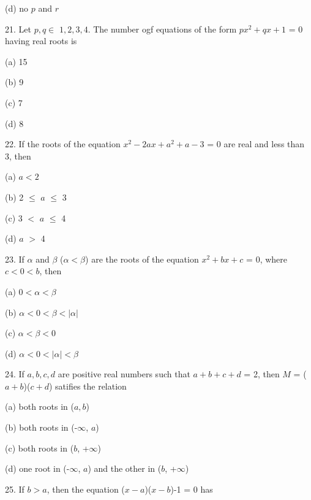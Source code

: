 \documentclass[journal,12pt,twocolumn]{IEEEtran}
\theoremstyle{remark}
\begin{document}
(d) no $p$ and $r$

21.    Let $p,q \in$  ${1, 2, 3, 4}$. The number ogf equations of the form $px^2+qx+1$ = 0 having real roots is

(a) 15

(b) 9

(c) 7

(d) 8

22.    If the roots of the equation $x^2-2ax+a^2+a-3$ = 0 are real and less than 3, then

(a) $a<2$

(b) 2 $\leq$ $a$ $\leq$ 3

(c) 3 $<$ $a$ $\leq$ 4

(d) $a$ $>$ 4

23.    If $\alpha$ and $\beta$ ($\alpha < \beta$) are the roots of the equation $x^2+bx+c$ = 0, where $c < 0 < b$, then

(a) $0 < \alpha < \beta$ 

(b) $\alpha < 0 < \beta < |\alpha|$

(c) $\alpha < \beta <0$

(d) $\alpha < 0 < |\alpha| < \beta$

24.    If $a, b, c, d$ are positive real numbers such that $a+b+c+d$ = 2, then $M$ = ($a+b$)($c+d$) satifies the relation 

(a) both roots in ($a,b$)

(b) both roots in (-$\infty$, $a$)

(c) both roots in ($b$, +$\infty$)

(d) one root in (-$\infty$, $a$) and the other in ($b$, +$\infty$)

25.    If $b > a$, then the equation ($x-a$)($x-b$)-1 = 0 has 
\end{document}
